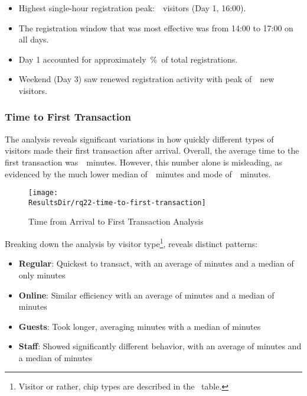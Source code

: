 \begin{keytakeaways}
	\begin{itemize}
		\item Highest single-hour registration peak:~~visitors (Day 1, 16:00).
		\item The registration window that was most effective was from 14:00 to 17:00 on all days.
		\item Day 1 accounted for approximately~\%~of total registrations.
		\item Weekend (Day 3) saw renewed registration activity with peak of~~new visitors.
	\end{itemize}
\end{keytakeaways}


\subsubsection{Time to First Transaction}
\label{subsubsec:analysis-first-transaction}


The analysis reveals significant variations in how quickly different types of visitors made their first transaction after arrival.
Overall, the average time to the first transaction was~~minutes.
However, this number alone is misleading, as evidenced by the much lower median of~~minutes and mode of~~minutes.

\begin{figure}[H]
	\centering
	\texttt{[image: \\ResultsDir/rq22-time-to-first-transaction]}
	\caption{Time from Arrival to First Transaction Analysis}
	\label{fig:time-to-first-transaction}
	\source
\end{figure}

Breaking down the analysis by visitor type\footnote{Visitor or rather, chip types are described in the~ table.}, reveals distinct patterns:

\begin{itemize}
	\item \textbf{Regular}: Quickest to transact, with an average of  minutes and a median of only  minutes
	\item \textbf{Online}: Similar efficiency with an average of  minutes and a median of  minutes
	\item \textbf{Guests}: Took longer, averaging  minutes with a median of  minutes
	\item \textbf{Staff}: Showed significantly different behavior, with an average of  minutes and a median of  minutes
\end{itemize}


